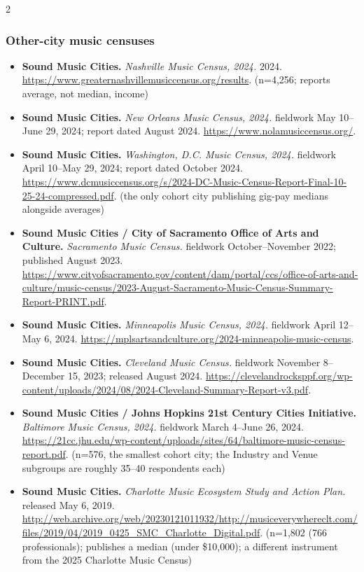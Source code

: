 {\begin{multicols}{2}
\subsubsection*{Other-city music censuses}
\begin{itemize}[itemsep=0pt,topsep=1pt,parsep=0pt,partopsep=0pt,leftmargin=1em]
\item \textbf{Sound Music Cities.} \textit{Nashville Music Census, 2024.} 2024. \url{https://www.greaternashvillemusiccensus.org/results}. {\color{ammuted}(n=4,256; reports average, not median, income)}
\item \textbf{Sound Music Cities.} \textit{New Orleans Music Census, 2024.} fieldwork May 10--June 29, 2024; report dated August 2024. \url{https://www.nolamusiccensus.org/}.
\item \textbf{Sound Music Cities.} \textit{Washington, D.C. Music Census, 2024.} fieldwork April 10--May 29, 2024; report dated October 2024. \url{https://www.dcmusiccensus.org/s/2024-DC-Music-Census-Report-Final-10-25-24-compressed.pdf}. {\color{ammuted}(the only cohort city publishing gig-pay medians alongside averages)}
\item \textbf{Sound Music Cities / City of Sacramento Office of Arts and Culture.} \textit{Sacramento Music Census.} fieldwork October--November 2022; published August 2023. \url{https://www.cityofsacramento.gov/content/dam/portal/ccs/office-of-arts-and-culture/music-census/2023-August-Sacramento-Music-Census-Summary-Report-PRINT.pdf}.
\item \textbf{Sound Music Cities.} \textit{Minneapolis Music Census, 2024.} fieldwork April 12--May 6, 2024. \url{https://mplsartsandculture.org/2024-minneapolis-music-census}.
\item \textbf{Sound Music Cities.} \textit{Cleveland Music Census.} fieldwork November 8--December 15, 2023; released August 2024. \url{https://clevelandrocksppf.org/wp-content/uploads/2024/08/2024-Cleveland-Summary-Report-v3.pdf}.
\item \textbf{Sound Music Cities / Johns Hopkins 21st Century Cities Initiative.} \textit{Baltimore Music Census, 2024.} fieldwork March 4--June 26, 2024. \url{https://21cc.jhu.edu/wp-content/uploads/sites/64/baltimore-music-census-report.pdf}. {\color{ammuted}(n=576, the smallest cohort city; the Industry and Venue subgroups are roughly 35--40 respondents each)}
\item \textbf{Sound Music Cities.} \textit{Charlotte Music Ecosystem Study and Action Plan.} released May 6, 2019. \url{http://web.archive.org/web/20230121011932/http://musiceverywhereclt.com/files/2019/04/2019_0425_SMC_Charlotte_Digital.pdf}. {\color{ammuted}(n=1,802 (766 professionals); publishes a median (under \$10,000); a different instrument from the 2025 Charlotte Music Census)}

\end{itemize}
\end{multicols}}
